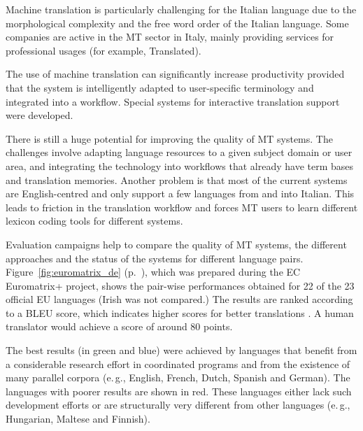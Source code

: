 \begin{multicols}{2}

Machine translation is particularly challenging for the Italian language due to the morphological complexity and the free word order of the Italian language. Some companies are active in the MT sector in Italy, mainly providing services for professional usages (for example, Translated).

The use of machine translation can significantly increase productivity
provided that the system is intelligently adapted to user-specific terminology
and integrated into a workflow. Special systems for interactive translation
support were developed.

There is still a huge potential for improving the quality of MT systems. The challenges involve adapting language resources to a given subject domain or user area, and integrating the technology into workflows that already have term bases and translation memories. Another problem is that most of the current systems are English-centred and only support a few languages from and into Italian. This leads to friction in the translation workflow and forces MT users to learn different lexicon coding tools for different systems.

Evaluation campaigns help to compare the quality of MT systems, the different approaches and the status of the systems for different language pairs. Figure~\ref{fig:euromatrix_de} (p.~\pageref{fig:euromatrix_de}), which was prepared during the EC Euromatrix+ project, shows the pair-wise performances obtained for 22 of the 23 official EU languages (Irish was not compared.) The results are ranked according to a BLEU score, which indicates higher scores for better translations \cite{bleu1}. A human translator would achieve a score of around 80 points. 

The best results (in green and blue) were achieved by languages that benefit from a considerable research effort in coordinated programs and from the existence of many parallel corpora (e.\,g., English, French, Dutch, Spanish and German). The languages with poorer results are shown in red. These languages either lack such development efforts or are structurally very different from other languages (e.\,g., Hungarian, Maltese and Finnish).











\end{multicols}
